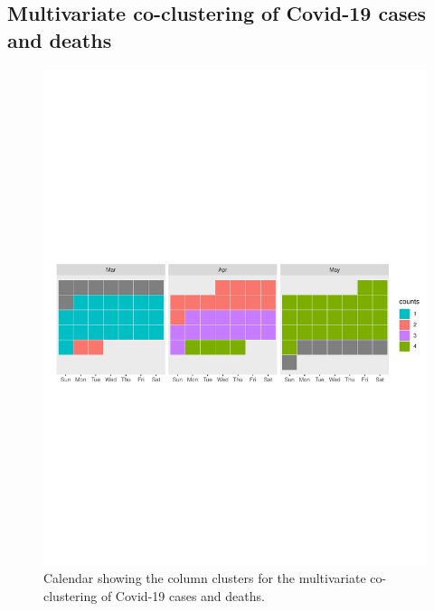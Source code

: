 \documentclass[12pt,a4paper]{article}
\begin{document}
\subsection{Multivariate co-clustering of Covid-19 cases and deaths}
\begin{figure}[H]
	\begin{center}
		\includegraphics[width=\columnwidth]{Multi_calendar.pdf}
		\caption{Calendar showing the column clusters for the multivariate co-clustering of Covid-19 cases and deaths.}
		
	\end{center}
\end{figure}
\end{document}
